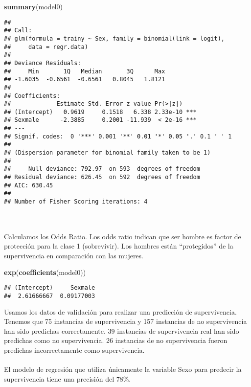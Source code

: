\documentclass[
]{article}
\newenvironment{Shaded}{\begin{snugshade}}{\end{snugshade}}
\newcommand{\KeywordTok}[1]{\textcolor[rgb]{0.13,0.29,0.53}{\textbf{#1}}}
\newcommand{\NormalTok}[1]{#1}
\begin{document}
\begin{Shaded}
\begin{Highlighting}[]
\KeywordTok{summary}\NormalTok{(model0)}
\end{Highlighting}
\end{Shaded}

\begin{verbatim}
## 
## Call:
## glm(formula = trainy ~ Sex, family = binomial(link = logit), 
##     data = regr.data)
## 
## Deviance Residuals: 
##     Min       1Q   Median       3Q      Max  
## -1.6035  -0.6561  -0.6561   0.8045   1.8121  
## 
## Coefficients:
##             Estimate Std. Error z value Pr(>|z|)    
## (Intercept)   0.9619     0.1518   6.338 2.33e-10 ***
## Sexmale      -2.3885     0.2001 -11.939  < 2e-16 ***
## ---
## Signif. codes:  0 '***' 0.001 '**' 0.01 '*' 0.05 '.' 0.1 ' ' 1
## 
## (Dispersion parameter for binomial family taken to be 1)
## 
##     Null deviance: 792.97  on 593  degrees of freedom
## Residual deviance: 626.45  on 592  degrees of freedom
## AIC: 630.45
## 
## Number of Fisher Scoring iterations: 4
\end{verbatim}

\texttt{}\\
\texttt{}~\\
Calculamos los Odds Ratio. Los odds ratio indican que ser hombre es
factor de protección para la clase 1 (sobrevivir). Los hombres están
``protegidos'' de la supervivencia en comparación con las mujeres.

\texttt{}

\begin{Shaded}
\begin{Highlighting}[]
\KeywordTok{exp}\NormalTok{(}\KeywordTok{coefficients}\NormalTok{(model0))}
\end{Highlighting}
\end{Shaded}

\begin{verbatim}
## (Intercept)     Sexmale 
##  2.61666667  0.09177003
\end{verbatim}

\texttt{}

Usamos los datos de validación para realizar una predicción de
supervivencia. Tenemos que 75 instancias de supervivencia y 157
instancias de no supervivencia han sido predichas correctamente. 39
instancias de supervivencia real han sido predichas como no
supervivencia. 26 instancias de no supervivencia fueron predichas
incorrectamente como supervivencia.\\
\texttt{}~\\
El modelo de regresión que utiliza únicamente la variable Sexo para
predecir la supervivencia tiene una precisión del 78\%.\\
\texttt{}
\end{document}
